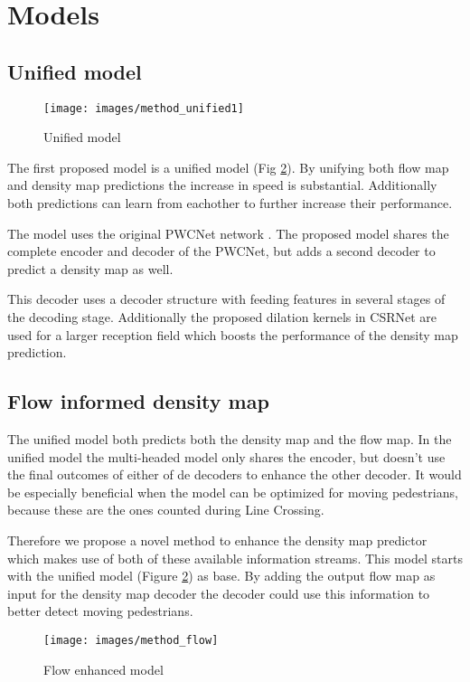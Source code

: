 \section{Models}

\subsection{Unified model}
\begin{figure}[h]
\centering
\texttt{[image: images/method\_unified1]}
\caption{Unified model}
\label{fig:unified_model}
\end{figure}
The first proposed model is a unified model (Fig \ref{fig:unified_model}). By unifying both flow map and density map predictions the increase in speed is substantial. Additionally both predictions can learn from eachother to further increase their performance.

The model uses the original PWCNet network \cite{sun_pwc-net_2018}. The proposed model shares the complete encoder and decoder of the PWCNet, but adds a second decoder to predict a density map as well.

This decoder uses a decoder structure with feeding features in several stages of the decoding stage. Additionally the proposed dilation kernels in CSRNet\cite{li2018csrnet} are used for a larger reception field which boosts the performance of the density map prediction.

\subsection{Flow informed density map}
The unified model both predicts both the density map and the flow map. In the unified model the multi-headed model only shares the encoder, but doesn't use the final outcomes of either of de decoders to enhance the other decoder. It would be especially beneficial when the model can be optimized for moving pedestrians, because these are the ones counted during Line Crossing.

Therefore we propose a novel method to enhance the density map predictor which makes use of both of these available information streams. This model starts with the unified model (Figure \ref{fig:unified_model}) as base. By adding the output flow map as input for the density map decoder the decoder could use this information to better detect moving pedestrians.


\begin{figure}[h]
\centering
\texttt{[image: images/method\_flow]}
\caption{Flow enhanced model}
\label{fig:unified_model}
\end{figure}

